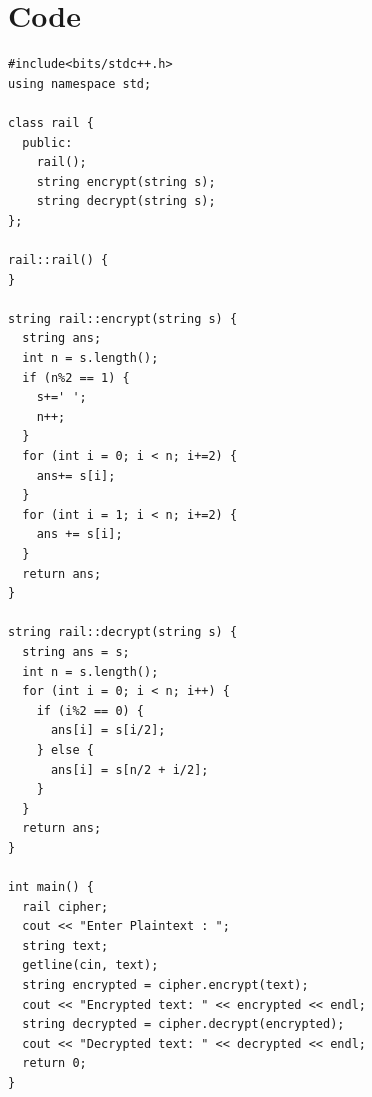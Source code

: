 



\section{Code}
\begin{verbatim}
#include<bits/stdc++.h>
using namespace std;

class rail {
  public:
    rail();
    string encrypt(string s);
    string decrypt(string s);
};

rail::rail() {
}

string rail::encrypt(string s) {
  string ans;
  int n = s.length();
  if (n%2 == 1) {
    s+=' ';
    n++;
  }
  for (int i = 0; i < n; i+=2) {
    ans+= s[i];
  }
  for (int i = 1; i < n; i+=2) {
    ans += s[i];
  }
  return ans;
}

string rail::decrypt(string s) {
  string ans = s;
  int n = s.length();
  for (int i = 0; i < n; i++) {
    if (i%2 == 0) {
      ans[i] = s[i/2];
    } else {
      ans[i] = s[n/2 + i/2];
    }
  }
  return ans;
}

int main() {
  rail cipher;
  cout << "Enter Plaintext : ";
  string text;
  getline(cin, text);
  string encrypted = cipher.encrypt(text);
  cout << "Encrypted text: " << encrypted << endl;
  string decrypted = cipher.decrypt(encrypted);
  cout << "Decrypted text: " << decrypted << endl;
  return 0;
}

\end{verbatim}

